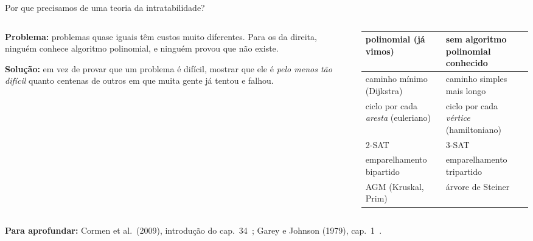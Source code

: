 \documentclass[aspectratio=169,xcolor=table]{beamer}
\newcommand{\fonte}[1]{%
  \vfill
  {\tiny\color{gray!55!black}\textbf{Para aprofundar:} #1\par}%
}
\begin{document}
\begin{frame}{Por que precisamos de uma teoria da intratabilidade?}
  \begin{columns}[T]
    \begin{column}{0.4\textwidth}
      \small
      \textbf{Problema:} problemas quase iguais têm custos muito diferentes. Para os da
      direita, ninguém conhece algoritmo polinomial, e ninguém provou que não existe.
      \medskip

      {\scriptsize\textbf{Solução:} em vez de provar que um problema é difícil, mostrar que
      ele é \emph{pelo menos tão difícil} quanto centenas de outros em que muita gente já
      tentou e falhou.\par}
    \end{column}
    \begin{column}{0.58\textwidth}
      \tiny
      \centering
      \begin{tabular}{ll}
        \toprule
        polinomial (já vimos) & sem algoritmo polinomial conhecido \\
        \midrule
        caminho mínimo (Dijkstra) & caminho simples mais longo \\
        ciclo por cada \emph{aresta} (euleriano) & ciclo por cada \emph{vértice} (hamiltoniano) \\
        2-SAT & 3-SAT \\
        emparelhamento bipartido & emparelhamento tripartido \\
        AGM (Kruskal, Prim) & árvore de Steiner \\
        \bottomrule
      \end{tabular}
    \end{column}
  \end{columns}
  \fonte{Cormen et al.\ (2009), introdução do cap.~34~\cite{cormen2009introduction};
    Garey e Johnson (1979), cap.~1~\cite{garey1979computers}.}
\end{frame}
\end{document}
